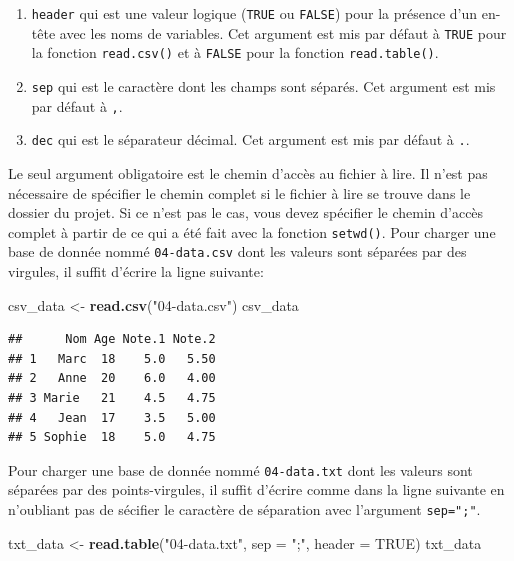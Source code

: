 \documentclass[
]{book}
\newenvironment{Shaded}{\begin{snugshade}}{\end{snugshade}}
\newcommand{\AttributeTok}[1]{\textcolor[rgb]{0.13,0.29,0.53}{#1}}
\newcommand{\ConstantTok}[1]{\textcolor[rgb]{0.56,0.35,0.01}{#1}}
\newcommand{\FunctionTok}[1]{\textcolor[rgb]{0.13,0.29,0.53}{\textbf{#1}}}
\newcommand{\NormalTok}[1]{#1}
\newcommand{\OtherTok}[1]{\textcolor[rgb]{0.56,0.35,0.01}{#1}}
\newcommand{\StringTok}[1]{\textcolor[rgb]{0.31,0.60,0.02}{#1}}
\providecommand{\tightlist}{%
  \setlength{\itemsep}{0pt}\setlength{\parskip}{0pt}}
\begin{document}
\begin{enumerate}
\def\labelenumi{\arabic{enumi}.}
\tightlist
\item
  \texttt{header} qui est une valeur logique (\texttt{TRUE} ou \texttt{FALSE}) pour la présence d'un en-tête avec les noms de variables. Cet argument est mis par défaut à \texttt{TRUE} pour la fonction \texttt{read.csv()} et à \texttt{FALSE} pour la fonction \texttt{read.table()}.
\item
  \texttt{sep} qui est le caractère dont les champs sont séparés. Cet argument est mis par défaut à \texttt{,}.
\item
  \texttt{dec} qui est le séparateur décimal. Cet argument est mis par défaut à \texttt{.}.
\end{enumerate}

Le seul argument obligatoire est le chemin d'accès au fichier à lire. Il n'est pas nécessaire de spécifier le chemin complet si le fichier à lire se trouve dans le dossier du projet. Si ce n'est pas le cas, vous devez spécifier le chemin d'accès complet à partir de ce qui a été fait avec la fonction \texttt{setwd()}. Pour charger une base de donnée nommé \texttt{04-data.csv} dont les valeurs sont séparées par des virgules, il suffit d'écrire la ligne suivante:

\begin{Shaded}
\begin{Highlighting}[]
\NormalTok{csv\_data }\OtherTok{\textless{}{-}} \FunctionTok{read.csv}\NormalTok{(}\StringTok{"04{-}data.csv"}\NormalTok{)}
\NormalTok{csv\_data}
\end{Highlighting}
\end{Shaded}

\begin{verbatim}
##      Nom Age Note.1 Note.2
## 1   Marc  18    5.0   5.50
## 2   Anne  20    6.0   4.00
## 3 Marie   21    4.5   4.75
## 4   Jean  17    3.5   5.00
## 5 Sophie  18    5.0   4.75
\end{verbatim}

Pour charger une base de donnée nommé \texttt{04-data.txt} dont les valeurs sont séparées par des points-virgules, il suffit d'écrire comme dans la ligne suivante en n'oubliant pas de sécifier le caractère de séparation avec l'argument \texttt{sep=";"}.

\begin{Shaded}
\begin{Highlighting}[]
\NormalTok{txt\_data }\OtherTok{\textless{}{-}} \FunctionTok{read.table}\NormalTok{(}\StringTok{"04{-}data.txt"}\NormalTok{, }\AttributeTok{sep =} \StringTok{";"}\NormalTok{, }\AttributeTok{header =} \ConstantTok{TRUE}\NormalTok{)}
\NormalTok{txt\_data}
\end{Highlighting}
\end{Shaded}
\end{document}
